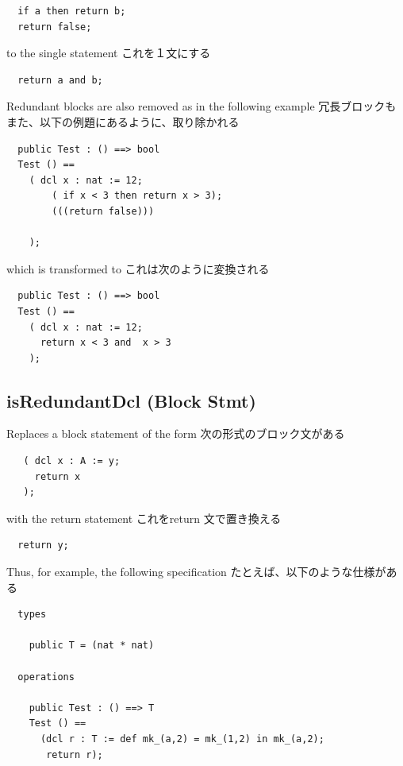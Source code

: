 \documentclass[\pformat,12pt]{jarticle}
\begin{document}
\begin{verbatim}
  if a then return b;
  return false;
\end{verbatim}

to the single statement
これを１文にする

\begin{verbatim}
  return a and b;
\end{verbatim}

Redundant blocks are also removed as in the following example
冗長ブロックもまた、以下の例題にあるように、取り除かれる

\begin{verbatim}
  public Test : () ==> bool
  Test () ==
    ( dcl x : nat := 12;
        ( if x < 3 then return x > 3);
        (((return false)))
                
    );
\end{verbatim}

which is transformed to
これは次のように変換される

\begin{verbatim}
  public Test : () ==> bool
  Test () ==
    ( dcl x : nat := 12;
      return x < 3 and  x > 3 
    ); 
\end{verbatim}

\subsection{isRedundantDcl (Block Stmt)}
  Replaces a block statement of the form
  次の形式のブロック文がある

\begin{verbatim}
   ( dcl x : A := y;
     return x
   );
\end{verbatim}

with the return statement
これをreturn 文で置き換える 

\begin{verbatim}
  return y;
\end{verbatim}

Thus, for example, the following specification
たとえば、以下のような仕様がある

\begin{verbatim}
  types

    public T = (nat * nat)

  operations

    public Test : () ==> T
    Test () ==
      (dcl r : T := def mk_(a,2) = mk_(1,2) in mk_(a,2);
       return r);
\end{verbatim}
\end{document}
